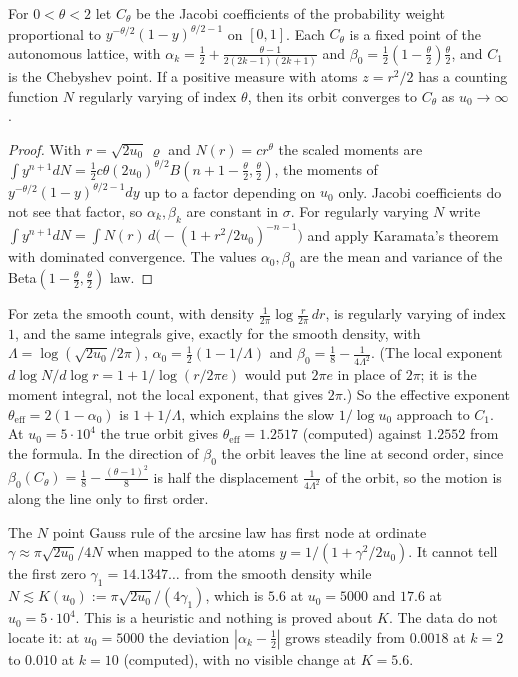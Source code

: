 \begin{theorem}\label{lx:thm:line}
For $0<\theta<2$ let $C_\theta$ be the Jacobi coefficients of the probability weight proportional to $y^{-\theta/2}(1-y)^{\theta/2-1}$ on $[0,1]$. Each $C_\theta$ is a fixed point of the autonomous lattice, with $\alpha_k=\frac12+\frac{\theta-1}{2(2k-1)(2k+1)}$ and $\beta_0=\frac12(1-\frac\theta2)\frac\theta2$, and $C_1$ is the Chebyshev point. If a positive measure with atoms $z=r^2/2$ has a counting function $N$ regularly varying of index $\theta$, then its orbit converges to $C_\theta$ as $u_0\to\infty$.
\end{theorem}

\begin{proof}
With $r=\sqrt{2u_0}\,\varrho$ and $N(r)=cr^\theta$ the scaled moments are $\int y^{n+1}dN=\frac12c\theta(2u_0)^{\theta/2}B(n+1-\frac\theta2,\frac\theta2)$, the moments of $y^{-\theta/2}(1-y)^{\theta/2-1}dy$ up to a factor depending on $u_0$ only. Jacobi coefficients do not see that factor, so $\alpha_k,\beta_k$ are constant in $\sigma$. For regularly varying $N$ write $\int y^{n+1}dN=\int N(r)\,d\bigl(-(1+r^2/2u_0)^{-n-1}\bigr)$ and apply Karamata's theorem \cite{BGT87} with dominated convergence. The values $\alpha_0,\beta_0$ are the mean and variance of the Beta$(1-\frac\theta2,\frac\theta2)$ law.
\end{proof}

For zeta the smooth count, with density $\frac1{2\pi}\log\frac r{2\pi}\,dr$, is regularly varying of index $1$, and the same integrals give, exactly for the smooth density, with $\Lambda=\log(\sqrt{2u_0}/2\pi)$, $\alpha_0=\frac12(1-1/\Lambda)$ and $\beta_0=\frac18-\frac1{4\Lambda^2}$. (The local exponent $d\log N/d\log r=1+1/\log(r/2\pi e)$ would put $2\pi e$ in place of $2\pi$; it is the moment integral, not the local exponent, that gives $2\pi$.) So the effective exponent $\theta_{\mathrm{eff}}=2(1-\alpha_0)$ is $1+1/\Lambda$, which explains the slow $1/\log u_0$ approach to $C_1$. At $u_0=5\cdot10^4$ the true orbit gives $\theta_{\mathrm{eff}}=1.2517$ (computed) against $1.2552$ from the formula. In the direction of $\beta_0$ the orbit leaves the line at second order, since $\beta_0(C_\theta)=\frac18-\frac{(\theta-1)^2}8$ is half the displacement $\frac1{4\Lambda^2}$ of the orbit, so the motion is along the line only to first order.

\begin{remark}
The $N$ point Gauss rule of the arcsine law has first node at ordinate $\gamma\approx\pi\sqrt{2u_0}/4N$ when mapped to the atoms $y=1/(1+\gamma^2/2u_0)$. It cannot tell the first zero $\gamma_1=14.1347\ldots$ from the smooth density while $N\lesssim K(u_0):=\pi\sqrt{2u_0}/(4\gamma_1)$, which is $5.6$ at $u_0=5000$ and $17.6$ at $u_0=5\cdot10^4$. This is a heuristic and nothing is proved about $K$. The data do not locate it: at $u_0=5000$ the deviation $|\alpha_k-\frac12|$ grows steadily from $0.0018$ at $k=2$ to $0.010$ at $k=10$ (computed), with no visible change at $K=5.6$.
\end{remark}

